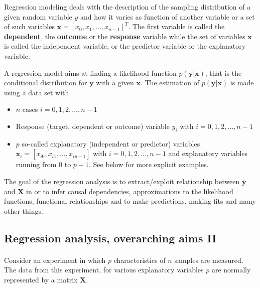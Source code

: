 \documentclass[%
oneside,                 %
final,                   %
10pt]{article}
\begin{document}
Regression modeling deals with the description of  the sampling distribution of a given random variable $y$ and how it varies as function of another variable or a set of such variables $\bm{x} =[x_0, x_1,\dots, x_{n-1}]^T$. 
The first variable is called the \textbf{dependent}, the \textbf{outcome} or the \textbf{response} variable while the set of variables $\bm{x}$ is called the independent variable, or the predictor variable or the explanatory variable. 

A regression model aims at finding a likelihood function $p(\bm{y}\vert \bm{x})$, that is the conditional distribution for $\bm{y}$ with a given $\bm{x}$. The estimation of  $p(\bm{y}\vert \bm{x})$ is made using a data set with 
\begin{itemize}
\item $n$ cases $i = 0, 1, 2, \dots, n-1$ 

\item Response (target, dependent or outcome) variable $y_i$ with $i = 0, 1, 2, \dots, n-1$ 

\item $p$ so-called explanatory (independent or predictor) variables $\bm{x}_i=[x_{i0}, x_{i1}, \dots, x_{ip-1}]$ with $i = 0, 1, 2, \dots, n-1$ and explanatory variables running from $0$ to $p-1$. See below for more explicit examples.   
\end{itemize}

\noindent
 The goal of the regression analysis is to extract/exploit relationship between $\bm{y}$ and $\bm{X}$ in or to infer causal dependencies, approximations to the likelihood functions, functional relationships and to make predictions, making fits and many other things.



\subsection{Regression analysis, overarching aims II}

\paragraph{}


Consider an experiment in which $p$ characteristics of $n$ samples are
measured. The data from this experiment, for various explanatory variables $p$ are normally represented by a matrix  
$\mathbf{X}$.
\end{document}
